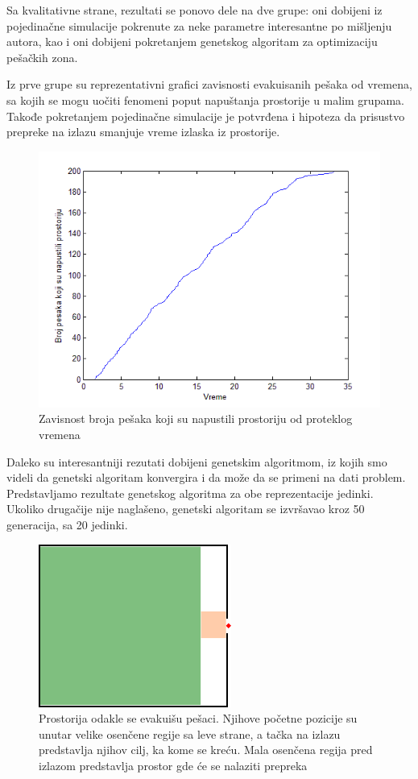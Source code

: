\documentclass[12pt]{article}
\begin{document}
Sa kvalitativne strane, rezultati se ponovo dele na dve grupe: oni dobijeni iz pojedinačne simulacije pokrenute za neke parametre interesantne po mišljenju autora, kao i oni dobijeni pokretanjem genetskog algoritam za optimizaciju pešačkih zona.

Iz  prve grupe su reprezentativni grafici zavisnosti evakuisanih pešaka od vremena, sa kojih se mogu uočiti fenomeni poput napuštanja prostorije u malim grupama. Takođe pokretanjem pojedinačne simulacije je potvrđena i hipoteza da prisustvo prepreke na izlazu smanjuje vreme izlaska iz prostorije.

\begin{figure}[H]
\centering
\includegraphics[scale=.6]{04_Grafik_pesaci_vs_vreme}
\caption{Zavisnost broja pešaka koji su napustili prostoriju od proteklog vremena}
\end{figure}

Daleko su interesantniji rezutati dobijeni genetskim algoritmom, iz kojih smo videli da genetski algoritam konvergira i da može da se primeni na dati problem. Predstavljamo rezultate genetskog algoritma za obe reprezentacije jedinki. Ukoliko drugačije nije naglašeno, genetski algoritam se izvršavao kroz 50 generacija, sa 20 jedinki.

\begin{figure}[H]
\centering
\includegraphics{05_Prostorija}
\caption{Prostorija odakle se evakuišu pešaci. Njihove početne pozicije su unutar velike osenčene regije sa leve strane, a tačka na izlazu predstavlja njihov cilj, ka kome se kreću. Mala osenčena regija pred izlazom predstavlja prostor gde će se nalaziti prepreka}
\label{fig:prostorija1}
\end{figure}
\end{document}
